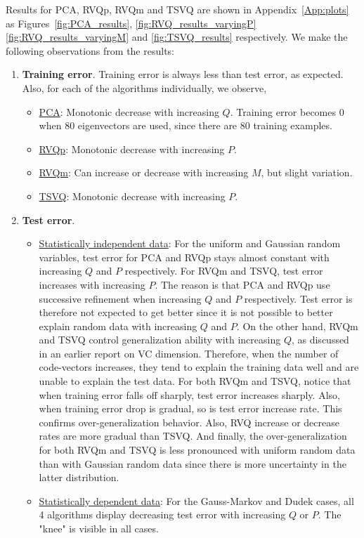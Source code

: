 Results for PCA, RVQp, RVQm and TSVQ are shown in Appendix~\ref{App:plots} as Figures~\ref{fig:PCA_results}, \ref{fig:RVQ_results_varyingP} \ref{fig:RVQ_results_varyingM} and \ref{fig:TSVQ_results} respectively.
We make the following observations from the results:
\begin{enumerate}
\item \textbf{Training error}. Training error is always less than test error, as expected. Also, for each of the algorithms individually, we observe,
\begin{itemize}
\item \underline{PCA}: Monotonic decrease with increasing $Q$. Training error becomes 0 when 80 eigenvectors are used, since there are 80 training examples.
\item \underline{RVQp}: Monotonic decrease with increasing $P$.
\item \underline{RVQm}: Can increase or decrease with increasing $M$, but slight variation.
\item \underline{TSVQ}: Monotonic decrease with increasing $P$.
\end{itemize}
\item \textbf{Test error}.
\begin{itemize}
\item \underline{Statistically independent data}: For the uniform and Gaussian random variables, test error for PCA and RVQp stays almost constant with increasing $Q$ and $P$ respectively. For RVQm and TSVQ, test error increases with increasing $P$. The reason is that PCA and RVQp use successive refinement when increasing $Q$ and $P$ respectively. Test error is therefore not expected to get better since it is not possible to better explain random data with increasing $Q$ and $P$.
On the other hand, RVQm and TSVQ control generalization ability with increasing $Q$, as discussed in an earlier report on VC dimension. Therefore, when the number of code-vectors increases, they tend to explain the training data well and are unable to explain the test data. For both RVQm and TSVQ, notice that when training error falls off sharply, test error increases sharply. Also, when training error drop is gradual, so is test error increase rate. This confirms over-generalization behavior. Also, RVQ increase or decrease rates are more gradual than TSVQ. And finally, the over-generalization for both RVQm and TSVQ is less pronounced with uniform random data than with Gaussian random data since there is more uncertainty in the latter distribution.
\item \underline{Statistically dependent data}: For the Gauss-Markov and Dudek cases, all 4 algorithms display decreasing test error with increasing $Q$ or $P$. The "knee" is visible in all cases.
\end{itemize}
\end{enumerate}

